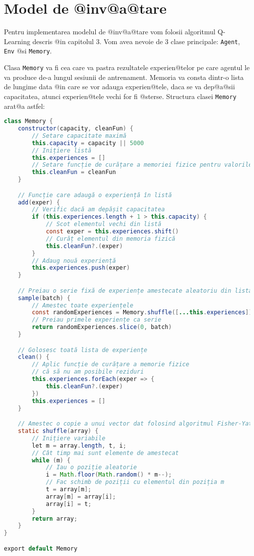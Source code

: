 \section{Model de @inv@a@tare}

Pentru implementarea modelul de @inv@a@tare vom folosii algoritmul Q-Learning descris @in capitolul 3. Vom avea nevoie de 3 clase principale: \texttt{Agent}, \texttt{Env} @si \texttt{Memory}.

Clasa \texttt{Memory} va fi cea care va pastra rezultatele experien@telor pe care agentul le va produce de-a lungul sesiunii de antrenament. Memoria va consta dintr-o lista de lungime data @in care se vor adauga experien@tele, daca se va dep@a@sii capacitatea, atunci experien@tele vechi for fi @sterse. Structura clasei \texttt{Memory} arat@a astfel:

\begin{lstlisting}[language=Java, caption={Structura clasei Memory}]
class Memory {
    constructor(capacity, cleanFun) {
        // Setare capacitate maximă
        this.capacity = capacity || 5000
        // Inițiere listă
        this.experiences = []
        // Setare funcție de curățare a memoriei fizice pentru valorile care vor fi distruse
        this.cleanFun = cleanFun
    }

    // Funcție care adaugă o experiență în listă
    add(exper) {
        // Verific dacă am depășit capacitatea
        if (this.experiences.length + 1 > this.capacity) {
            // Scot elementul vechi din listă
            const exper = this.experiences.shift()
            // Curăț elementul din memoria fizică
            this.cleanFun?.(exper)
        }
        // Adaug nouă experiență
        this.experiences.push(exper)
    }

    // Preiau o serie fixă de experiențe amestecate aleatoriu din lista
    sample(batch) {
        // Amestec toate experiențele
        const randomExperiences = Memory.shuffle([...this.experiences])
        // Preiau primele experiențe ca serie
        return randomExperiences.slice(0, batch)
    }

    // Golosesc toată lista de experiențe
    clean() {
        // Aplic funcție de curățare a memorie fizice
        // că să nu am posibile reziduri
        this.experiences.forEach(exper => {
            this.cleanFun?.(exper)
        })
        this.experiences = []
    }

    // Amestec o copie a unui vector dat folosind algoritmul Fisher-Yates
    static shuffle(array) {
        // Inițiere variabile
        let m = array.length, t, i;
        // Cât timp mai sunt elemente de amestecat
        while (m) {
            // Iau o poziție aleatorie
            i = Math.floor(Math.random() * m--);
            // Fac schimb de poziții cu elementul din poziția m
            t = array[m];
            array[m] = array[i];
            array[i] = t;
        }
        return array;
    }
}

export default Memory
\end{lstlisting}

